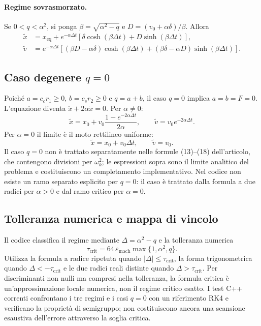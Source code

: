 \paragraph{Regime sovrasmorzato.}
Se $0<q<\alpha^2$, si ponga $\beta=\sqrt{\alpha^2-q}$ e $D=(v_0+\alpha\delta)/\beta$. Allora
\begin{align}
 \widetilde x&=x_{\mathrm{eq}}+e^{-\alpha\Delta t}
 \left[\delta\cosh(\beta\Delta t)+D\sinh(\beta\Delta t)\right],
 \label{eq:app-over-x}\\
 \widetilde v&=e^{-\alpha\Delta t}\left[
 (\beta D-\alpha\delta)\cosh(\beta\Delta t)
 +(\beta\delta-\alpha D)\sinh(\beta\Delta t)
 \right].
 \label{eq:app-over-v}
\end{align}

\subsection{Caso degenere $q=0$}

Poiché $a=c_cr_1\geq0$, $b=c_sr_2\geq0$ e $q=a+b$, il caso $q=0$ implica $a=b=F=0$. L'equazione diventa $\ddot x+2\alpha\dot x=0$. Per $\alpha\ne0$:
\begin{equation}
 \widetilde x=x_0+v_0\frac{1-e^{-2\alpha\Delta t}}{2\alpha},
 \qquad \widetilde v=v_0e^{-2\alpha\Delta t}.
 \label{eq:app-qzero}
\end{equation}
Per $\alpha=0$ il limite è il moto rettilineo uniforme:
\begin{equation}
 \widetilde x=x_0+v_0\Delta t,
 \qquad \widetilde v=v_0.
 \label{eq:app-qzero-alpha0}
\end{equation}
Il caso $q=0$ non è trattato separatamente nelle formule (13)--(18) dell'articolo, che contengono divisioni per $\omega_k^2$; le espressioni sopra sono il limite analitico del problema e costituiscono un completamento implementativo. Nel codice non esiste un ramo separato esplicito per $q=0$: il caso è trattato dalla formula a due radici per $\alpha>0$ e dal ramo critico per $\alpha=0$.

\subsection{Tolleranza numerica e mappa di vincolo}

Il codice classifica il regime mediante $\Delta=\alpha^2-q$ e la tolleranza numerica
\begin{equation}
\tau_{\mathrm{crit}}=64\,\varepsilon_{\mathrm{mach}}
\max\{1,\alpha^2,q\}.
\label{eq:app-critical-tolerance}
\end{equation}
Utilizza la formula a radice ripetuta quando $|\Delta|\leq\tau_{\mathrm{crit}}$, la forma trigonometrica quando $\Delta<-\tau_{\mathrm{crit}}$ e le due radici reali distinte quando $\Delta>\tau_{\mathrm{crit}}$. Per discriminanti non nulli ma compresi nella tolleranza, la formula critica è un'approssimazione locale numerica, non il regime critico esatto. I test C++ correnti confrontano i tre regimi e i casi $q=0$ con un riferimento RK4 e verificano la proprietà di semigruppo; non costituiscono ancora una scansione esaustiva dell'errore attraverso la soglia critica.

